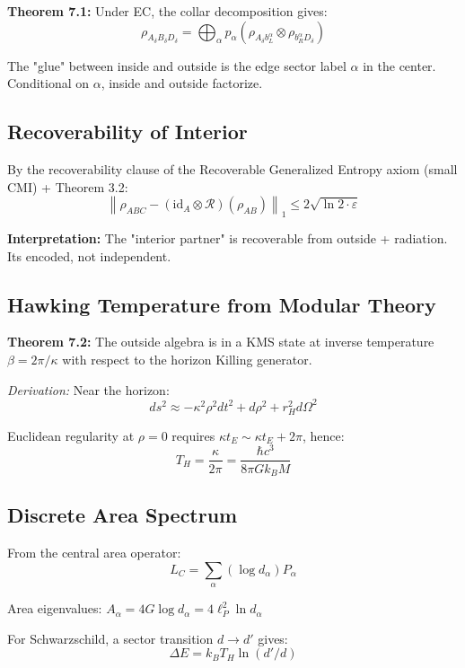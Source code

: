 \textbf{Theorem 7.1:} Under EC, the collar decomposition gives: \[\rho_{A_\delta B_\delta D_\delta} = \bigoplus_\alpha p_\alpha \left(\rho_{A_\delta b_L^\alpha} \otimes \rho_{b_R^\alpha D_\delta}\right)\]

The "glue" between inside and outside is the edge sector label \(\alpha\) in the center. Conditional on \(\alpha\), inside and outside factorize.

\subsection{Recoverability of Interior}\label{73-recoverability-of-interior}

By the recoverability clause of the Recoverable Generalized Entropy axiom (small CMI) + Theorem 3.2: \[\left\|\rho_{ABC} - (\text{id}_A \otimes \mathcal{R})(\rho_{AB})\right\|_1 \leq 2\sqrt{\ln 2 \cdot \varepsilon}\]

\textbf{Interpretation:} The "interior partner" is recoverable from outside + radiation. It\textquotesingle s encoded, not independent.

\subsection{Hawking Temperature from Modular Theory}\label{74-hawking-temperature-from-modular-theory}

\textbf{Theorem 7.2:} The outside algebra is in a KMS state at inverse temperature \(\beta = 2\pi/\kappa\) with respect to the horizon Killing generator.

\emph{Derivation:} Near the horizon: \[ds^2 \approx -\kappa^2 \rho^2 dt^2 + d\rho^2 + r_H^2 d\Omega^2\]

Euclidean regularity at \(\rho = 0\) requires \(\kappa t_E \sim \kappa t_E + 2\pi\), hence: \[T_H = \frac{\kappa}{2\pi} = \frac{\hbar c^3}{8\pi G k_B M}\]

\subsection{Discrete Area Spectrum}\label{75-discrete-area-spectrum}

From the central area operator: \[L_C = \sum_\alpha (\log d_\alpha) P_\alpha\]

Area eigenvalues: \(A_\alpha = 4G \log d_\alpha = 4\ell_P^2 \ln d_\alpha\)

For Schwarzschild, a sector transition \(d \to d'\) gives: \[\Delta E = k_B T_H \ln(d'/d)\]

